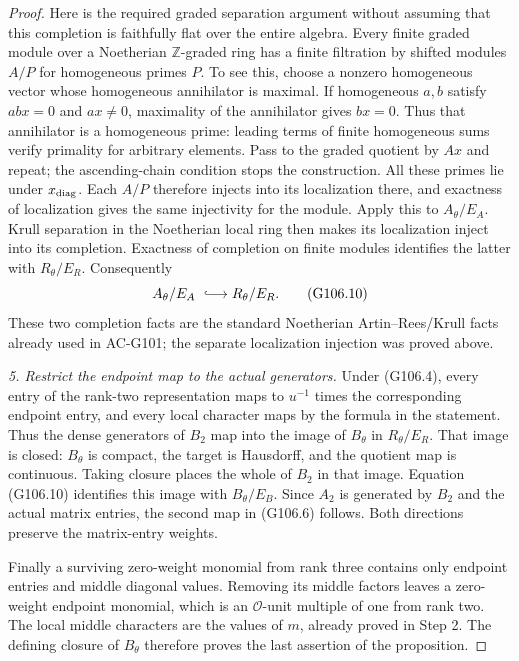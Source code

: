 \begin{proof}
Here is the required graded separation argument without assuming
that this completion is faithfully flat over the entire algebra.
Every finite graded module over a Noetherian \(\mathbb Z\)-graded
ring has a finite filtration by shifted modules \(A/P\) for
homogeneous primes \(P\).  To see this, choose a nonzero homogeneous
vector whose homogeneous annihilator is maximal.  If homogeneous
\(a,b\) satisfy \(abx=0\) and \(ax\ne0\), maximality of the
annihilator gives \(bx=0\).  Thus that annihilator is a homogeneous
prime: leading terms of finite homogeneous sums verify primality
for arbitrary elements.  Pass to the graded quotient by \(Ax\)
and repeat; the ascending-chain condition stops the construction.
All these primes lie under \(x_{\rm diag}\).
Each \(A/P\) therefore injects into its localization there, and
exactness of localization gives the same injectivity for the module.
Apply this to \(A_\theta/E_A\).
Krull separation in the Noetherian local ring then makes its
localization inject into its completion.  Exactness of completion
on finite modules identifies the latter with \(R_\theta/E_R\).
Consequently
\[
                 A_\theta/E_A\ \lhook\joinrel\longrightarrow
                                  R_\theta/E_R .
 \tag{G106.10}
\]
These two completion facts are the standard Noetherian
Artin--Rees/Krull facts already used in AC-G101; the separate
localization injection was proved above.

\emph{5. Restrict the endpoint map to the actual generators.}
Under (G106.4), every entry of the rank-two representation maps to
\(u^{-1}\) times the corresponding endpoint entry, and every
local character maps by the formula in the statement.
Thus the dense generators of \(B_2\) map into the image of
\(B_\theta\) in \(R_\theta/E_R\).
That image is closed: \(B_\theta\) is compact, the target is
Hausdorff, and the quotient map is continuous.
Taking closure places the whole of \(B_2\) in that image.
Equation (G106.10) identifies this image with
\(B_\theta/E_B\).  Since \(A_2\) is generated by \(B_2\)
and the actual matrix entries, the second map in (G106.6) follows.
Both directions preserve the matrix-entry weights.

Finally a surviving zero-weight monomial from rank three contains
only endpoint entries and middle diagonal values.  Removing its
middle factors leaves a zero-weight endpoint monomial, which is
an \(\mathcal O\)-unit multiple of one from rank two.
The local middle characters are the values of \(m\), already
proved in Step 2.  The defining closure of \(B_\theta\) therefore
proves the last assertion of the proposition.
\end{proof}

